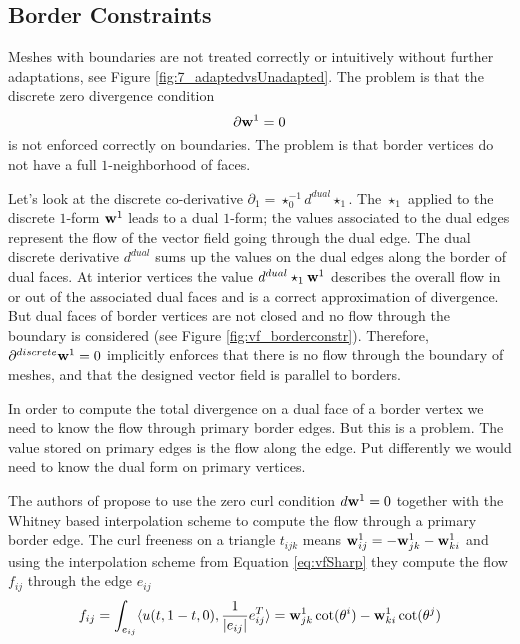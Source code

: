 \subsection{Border Constraints}


Meshes with boundaries are not treated correctly or intuitively without further adaptations, see Figure \ref{fig:7_adaptedvsUnadapted}. The problem is that the discrete zero divergence condition
\[\partial \textbf{w}^1 = 0\]
is not enforced correctly on boundaries. The problem is that border vertices do not have a full $1$-neighborhood of faces. 

Let's look at the discrete co-derivative $\partial_1 = \star^{-1}_0 d^{dual} \star_1$. The $\star_1$ applied to the discrete $1$-form $\textbf{w}^1$ leads to a dual $1$-form; the values associated to the dual edges represent the flow of the vector field going through the dual edge. The dual discrete derivative $d^{dual}$ sums up the values on the dual edges along the border of dual faces. At interior vertices the value $d^{dual} \star_1 \textbf{w}^1$ describes the overall flow in or out of the associated dual faces and is a correct approximation of divergence. But dual faces of border vertices are not closed and no flow through the boundary is considered (see Figure \ref{fig:vf_borderconstr}). Therefore, $\partial^{discrete} \textbf{w}^1 = 0$ implicitly enforces that there is no flow through the boundary of meshes, and that the designed vector field is parallel to borders.

In order to compute the total divergence on a dual face of a border vertex we need to know the flow through primary border edges. But this is a problem. The value stored on primary edges is the flow along the edge. Put differently we would need to know the dual form on primary vertices. %

The authors of \cite{vField} propose to use the zero curl condition $d\textbf{w}^1 = 0$ together with the Whitney based interpolation scheme to compute the flow through a primary border edge. The curl freeness on a triangle $t_{ijk}$ means $\textbf{w}^1_{ij} = - \textbf{w}^1_{jk} - \textbf{w}^1_{ki}$ and using the interpolation scheme from Equation \ref{eq:vfSharp} they compute the flow $f_{ij}$ through the edge $e_{ij}$
\begin{equation}f_{ij} = \int_{e_{ij}}\langle u(t, 1-t, 0), \frac{1}{\left| e_{ij} \right|}e_{ij}^{T}\rangle = \textbf{w}^1_{jk} \cot(\theta^i) - \textbf{w}^1_{ki} \cot(\theta^j)\label{eq:vfFluxBorder}\end{equation}



